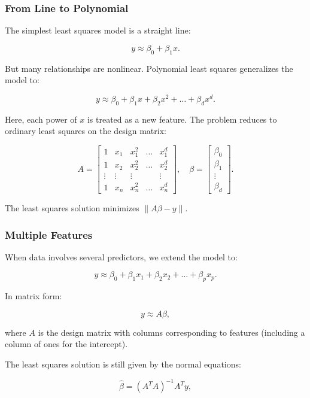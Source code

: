 \documentclass[
  letterpaper,
  DIV=11,
  numbers=noendperiod]{scrreprt}
\begin{document}
\subsubsection{From Line to Polynomial}\label{from-line-to-polynomial}

The simplest least squares model is a straight line:

\[
y \approx \beta_0 + \beta_1 x.
\]

But many relationships are nonlinear. Polynomial least squares
generalizes the model to:

\[
y \approx \beta_0 + \beta_1 x + \beta_2 x^2 + \dots + \beta_d x^d.
\]

Here, each power of \(x\) is treated as a new feature. The problem
reduces to ordinary least squares on the design matrix:

\[
A = \begin{bmatrix}
1 & x_1 & x_1^2 & \dots & x_1^d \\
1 & x_2 & x_2^2 & \dots & x_2^d \\
\vdots & \vdots & \vdots & & \vdots \\
1 & x_n & x_n^2 & \dots & x_n^d
\end{bmatrix},
\quad
\beta = \begin{bmatrix}\beta_0 \\ \beta_1 \\ \vdots \\ \beta_d\end{bmatrix}.
\]

The least squares solution minimizes \(\|A\beta - y\|\).

\subsubsection{Multiple Features}\label{multiple-features}

When data involves several predictors, we extend the model to:

\[
y \approx \beta_0 + \beta_1 x_1 + \beta_2 x_2 + \dots + \beta_p x_p.
\]

In matrix form:

\[
y \approx A\beta,
\]

where \(A\) is the design matrix with columns corresponding to features
(including a column of ones for the intercept).

The least squares solution is still given by the normal equations:

\[
\hat{\beta} = (A^T A)^{-1} A^T y,
\]
\end{document}

